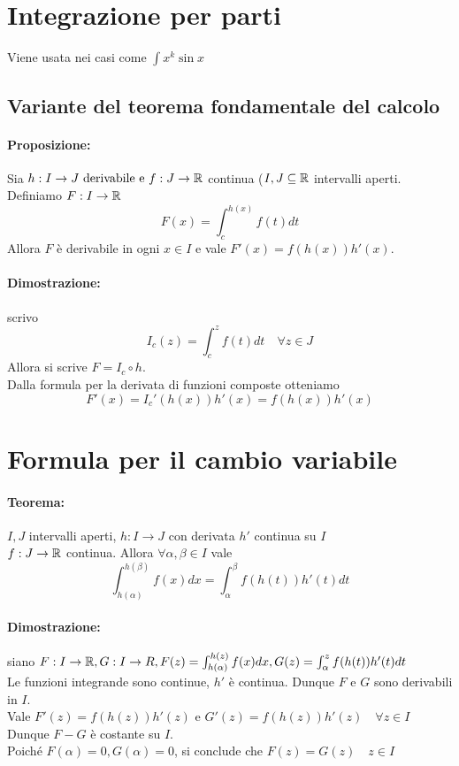 \documentclass{article}
\begin{document}
\section{Integrazione per parti}

Viene usata nei casi come $ \int x^k \sin x $

\subsection{Variante del teorema fondamentale del calcolo}

\paragraph{Proposizione:} Sia $ h: I\to J \text{ derivabile e } f:J \to \mathbb{R}$ continua ($I,J \subseteq \mathbb{R}$ intervalli aperti.
Definiamo $F:I \to \mathbb{R}$
$$
F(x) = \int_c^{h(x)} f(t)dt
	$$
Allora $F$ è derivabile in ogni $x \in I$ e vale  $F'(x)=f(h(x))h'(x)$.

\paragraph{Dimostrazione:} scrivo $$I_c(z) = \int_c^z f(t)dt \quad \forall z \in J$$
Allora si scrive $ F=I_c \circ h$. \\
Dalla formula per la derivata di funzioni composte otteniamo $$ F'(x) = I_c'(h(x))h'(x) = f(h(x))h'(x) $$


\section{Formula per il cambio variabile}
\paragraph{Teorema:} $I,J$ intervalli aperti, $h: I \to J$ con derivata $h'$ continua su $I$ \\
$f:J \to \mathbb{R}$ continua. \quad Allora $ \forall \alpha , \beta \in I $ vale
$$
\int_{h(\alpha)}^{h(\beta)} f(x)dx = \int_\alpha^\beta f(h(t))h'(t)dt
$$

\paragraph{Dimostrazione:} siano $F: I \to \mathbb{R}, G: I \to R, F(z)= \int_{h(\alpha)}^{h(z)} f(x)dx , G(z) = \int_\alpha^z f(h(t))h'(t)dt $ \\
Le funzioni integrande sono continue, $h'$ è continua. Dunque $F$ e $G$ sono derivabili in $I$. \\
Vale $F'(z)=f(h(z))h'(z)$ e $G'(z)=f(h(z))h'(z) \quad \forall z \in I$ \\
Dunque $F-G$ è costante su $I$. \\
Poiché $F(\alpha)=0, G(\alpha)=0$, si conclude che $F(z)=G(z) \quad z \in I$
\end{document}
